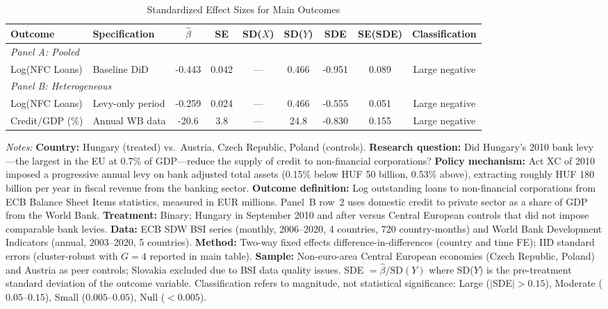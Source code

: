 \begin{table}[H]
\centering
\caption{Standardized Effect Sizes for Main Outcomes}
\label{tab:sde}
\small
\begin{adjustbox}{max width=\textwidth}
\begin{tabular}{llccccccc}
\toprule
Outcome & Specification & $\hat{\beta}$ & SE & SD($X$) & SD($Y$) & SDE & SE(SDE) & Classification \\
\midrule
\multicolumn{9}{l}{\textit{Panel A: Pooled}} \\
Log(NFC Loans) & Baseline DiD & -0.443 & 0.042 & --- & 0.466 & -0.951 & 0.089 & Large negative \\
\midrule
\multicolumn{9}{l}{\textit{Panel B: Heterogeneous}} \\
Log(NFC Loans) & Levy-only period & -0.259 & 0.024 & --- & 0.466 & -0.555 & 0.051 & Large negative \\
Credit/GDP (\%) & Annual WB data & -20.6 & 3.8 & --- & 24.8 & -0.830 & 0.155 & Large negative \\
\bottomrule
\end{tabular}
\end{adjustbox}
\par\vspace{0.3em}
{\footnotesize \textit{Notes:}
\textbf{Country:} Hungary (treated) vs.\ Austria, Czech Republic, Poland (controls).
\textbf{Research question:} Did Hungary's 2010 bank levy---the largest in the EU at 0.7\% of GDP---reduce the supply of credit to non-financial corporations?
\textbf{Policy mechanism:} Act XC of 2010 imposed a progressive annual levy on bank adjusted total assets (0.15\% below HUF 50 billion, 0.53\% above), extracting roughly HUF 180 billion per year in fiscal revenue from the banking sector.
\textbf{Outcome definition:} Log outstanding loans to non-financial corporations from ECB Balance Sheet Items statistics, measured in EUR millions. Panel~B row~2 uses domestic credit to private sector as a share of GDP from the World Bank.
\textbf{Treatment:} Binary; Hungary in September 2010 and after versus Central European controls that did not impose comparable bank levies.
\textbf{Data:} ECB SDW BSI series (monthly, 2006--2020, 4 countries, 720 country-months) and World Bank Development Indicators (annual, 2003--2020, 5 countries).
\textbf{Method:} Two-way fixed effects difference-in-differences (country and time FE); IID standard errors (cluster-robust with $G=4$ reported in main table).
\textbf{Sample:} Non-euro-area Central European economies (Czech Republic, Poland) and Austria as peer controls; Slovakia excluded due to BSI data quality issues.
SDE $= \hat{\beta} / \text{SD}(Y)$ where SD($Y$) is the pre-treatment standard deviation of the outcome variable.
Classification refers to magnitude, not statistical significance:
Large ($|$SDE$| > 0.15$), Moderate ($0.05$--$0.15$), Small ($0.005$--$0.05$), Null ($< 0.005$).}
\end{table}

